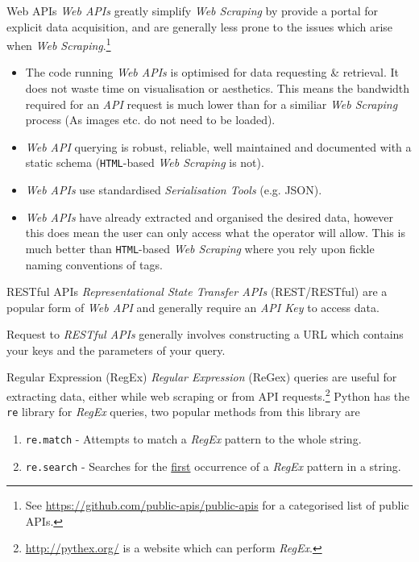 \documentclass[11pt,a4paper]{article}
\begin{document}
  \begin{definition}{Web APIs}
    \textit{Web APIs} greatly simplify \textit{Web Scraping} by provide a portal for explicit data acquisition, and are generally less prone to the issues which arise when \textit{Web Scraping}.\footnote{See \url{https://github.com/public-apis/public-apis} for a categorised list of public APIs.}
    \begin{itemize}
      \item The code running \textit{Web APIs} is optimised for data requesting \& retrieval. It does not waste time on visualisation or aesthetics. This means the bandwidth required for an \textit{API} request is much lower than for a similiar \textit{Web Scraping} process (As images etc. do not need to be loaded).
      \item \textit{Web API} querying is robust, reliable, well maintained and documented with a static schema (\texttt{HTML}-based \textit{Web Scraping} is not).
      \item \textit{Web APIs} use standardised \textit{Serialisation Tools} (e.g. JSON).
      \item \textit{Web APIs} have already extracted and organised the desired data, however this does mean the user can only access what the operator will allow. This is much better than \texttt{HTML}-based \textit{Web Scraping} where you rely upon fickle naming conventions of tags.
    \end{itemize}
  \end{definition}

  \begin{definition}{RESTful APIs}
    \textit{Representational State Transfer APIs} (REST/RESTful) are a popular form of \textit{Web API} and generally require an \textit{API Key} to access data.
    \par Request to \textit{RESTful APIs} generally involves constructing a URL which contains your keys and the parameters of your query.
  \end{definition}

  \begin{remark}{Regular Expression (RegEx)}
    \textit{Regular Expression} (ReGex) queries are useful for extracting data, either while web scraping or from API requests.\footnote{\url{http://pythex.org/} is a website which can perform \textit{RegEx}.} Python has the \texttt{re} library for \textit{RegEx} queries, two popular methods from this library are
    \begin{enumerate}
      \item \texttt{re.match} - Attempts to match a \textit{RegEx} pattern to the whole string.
      \item \texttt{re.search} - Searches for the \underline{first} occurrence of a \textit{RegEx} pattern in a string.
    \end{enumerate}
  \end{remark}
\end{document}
